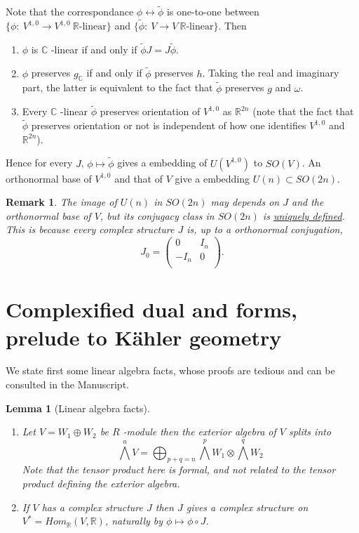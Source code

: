 \documentclass[11pt]{article}
\newtheorem{remark}{Remark}
\newtheorem{lemma}[theorem]{Lemma}
\begin{document}
Note that the correspondance \(\phi \leftrightarrow \tilde\phi\) is one-to-one between \(\{\phi:\
V^{1,0}\longrightarrow V^{1,0}\ \mathbb{R}\text{-linear}\}\) and \(\{\tilde\phi:\ V\longrightarrow V\
\mathbb{R}\text{-linear}\}\). Then
\begin{enumerate}
\item \(\phi\) is \(\mathbb{C}\) -linear if and only if \(\tilde\phi J = J\tilde\phi\).
\item \(\phi\) preserves \(g_{\mathbb{C}}\) if and only if \(\tilde\phi\) preserves \(h\). Taking the real
and imaginary part, the latter is equivalent to the fact that \(\tilde\phi\) preserves \(g\) and
\(\omega\).
\item Every \(\mathbb{C}\) -linear \(\tilde \phi\) preserves orientation of \(V^{1,0}\) as \(\mathbb{R}^{2n}\)
(note that the fact that \(\tilde\phi\) preserves orientation or not is independent of how one
identifies \(V^{1,0}\) and \(\mathbb{R}^{2n}\)).
\end{enumerate}
Hence for every \(J\), \(\phi\mapsto\tilde\phi\) gives a embedding of \(U(V^{1,0})\) to \(SO(V)\). An
orthonormal base of \(V^{1,0}\) and that of \(V\) give a embedding \(U(n)\subset SO(2n)\).

\begin{remark}
The image of \(U(n)\) in \(SO(2n)\) may depends on \(J\) and the orthonormal base of \(V\), but its
conjugacy class in \(SO(2n)\) is \uline{uniquely defined}. This is because every complex structure \(J\) is,
up to a orthonormal conjugation, 
\[
J_0 = \begin{pmatrix}
0 & I_n \\
-I_n & 0 \\
\end{pmatrix}.
\]
\end{remark}


\section{Complexified dual and forms, prelude to Kähler geometry}
\label{sec:org000bdde}

We state first some linear algebra facts, whose proofs are tedious and can be consulted in the Manuscript.

\begin{lemma}[Linear algebra facts]
\label{lem:alg-exterior}
\label{org8cd15df}
\begin{enumerate}
\item Let \(V = W_1 \oplus W_2\) be \(R\) -module then the exterior algebra of \(V\) splits into \[\bigwedge^nV
   = \bigoplus_{p+q = n}\bigwedge^p W_1 \otimes \bigwedge^q W_2 \] Note that the tensor product here
is formal, and not related to the tensor product defining the exterior algebra.
\item If \(V\) has a complex structure \(J\) then \(J\) gives a complex structure on \(V^* =
   Hom_{\mathbb{R}}(V, \mathbb{R})\), naturally by \(\phi\mapsto \phi\circ J\).
\end{enumerate}
\end{lemma}
\end{document}
